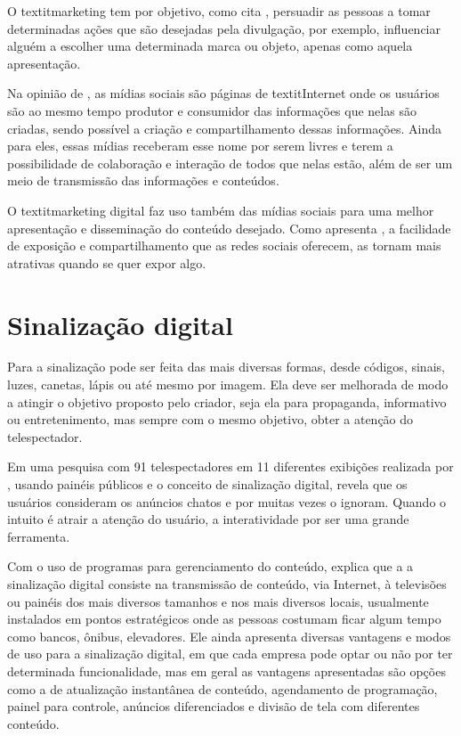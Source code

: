 O textit{marketing} tem por objetivo, como cita \cite{ryan2016}, persuadir as pessoas a tomar determinadas ações que são desejadas pela divulgação, por exemplo, influenciar alguém a escolher uma determinada marca ou objeto, apenas como aquela apresentação.

Na opinião de \cite{torres2000}, as mídias sociais são páginas de textit{Internet} onde os usuários são ao mesmo tempo produtor e consumidor das informações que nelas são criadas, sendo possível a criação e compartilhamento dessas informações. Ainda para eles, essas mídias receberam esse nome por serem livres e terem a possibilidade de
colaboração e interação de todos que nelas estão, além de ser um meio de transmissão das informações e conteúdos.

O textit{marketing} digital faz uso também das mídias sociais para uma melhor apresentação e disseminação do conteúdo desejado. Como apresenta \cite{torres2000}, a facilidade de exposição e compartilhamento que as redes sociais oferecem, as tornam mais atrativas quando se quer expor algo.

\section{Sinalização digital}
Para \cite{munari2006} a sinalização pode ser feita das mais diversas formas, desde códigos, sinais, luzes, canetas, lápis ou até mesmo por imagem. Ela deve ser melhorada de modo a atingir o objetivo proposto pelo criador, seja ela para propaganda, informativo ou entretenimento, mas sempre com o mesmo objetivo, obter a atenção do telespectador.

Em uma pesquisa com 91 telespectadores em 11 diferentes exibições realizada por \cite{muller2009}, usando painéis públicos e o conceito de sinalização digital, revela que os usuários consideram os anúncios chatos e por muitas vezes o ignoram. Quando o intuito é atrair a atenção do usuário, a interatividade por ser uma grande ferramenta.

Com o uso de programas para gerenciamento do conteúdo, \cite[p.31]{machado2010} explica que a a sinalização digital consiste na transmissão de conteúdo, via Internet, à televisões ou painéis dos mais diversos tamanhos e nos mais diversos locais, usualmente instalados em pontos estratégicos onde as pessoas costumam ficar algum tempo como bancos, ônibus, elevadores. Ele ainda apresenta diversas vantagens e modos de uso para a sinalização digital, em que cada empresa pode optar ou não por ter determinada funcionalidade, mas em geral as vantagens apresentadas são opções como a de atualização instantânea de conteúdo, agendamento de programação, painel para controle, anúncios diferenciados e divisão de tela com diferentes conteúdo.

